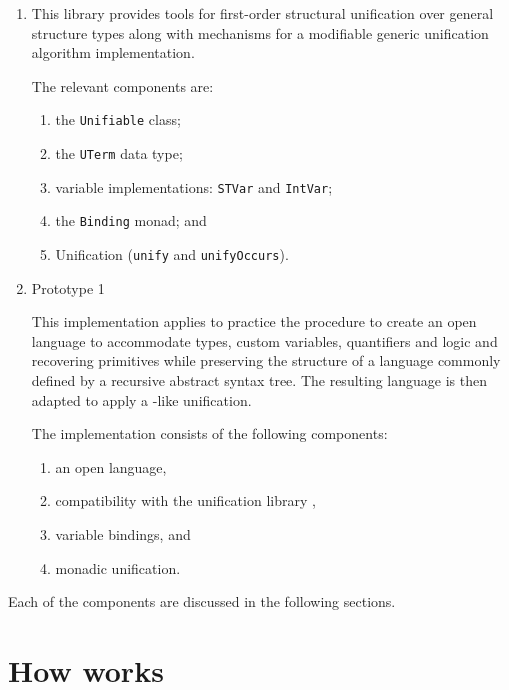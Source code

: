 \documentclass[thesis-solanki.tex]{subfiles}
\begin{document}
\begin{enumerate}
\item {} \cite{unification-fd-lib}

This library provides tools for first-order structural unification over general structure types along with mechanisms for a modifiable
generic unification algorithm implementation.

The relevant components are:
\begin{enumerate}
\item the \Verb!Unifiable! class;

\item the \Verb!UTerm! data type;

\item variable implementations:
  \Verb!STVar! and \Verb!IntVar!;

\item the \Verb!Binding! monad; and 

\item Unification (\Verb!unify! and \Verb!unifyOccurs!).
\end{enumerate}

\item Prototype 1

  This implementation applies to practice the procedure to create an open language to accommodate types,
  custom variables, quantifiers and logic and recovering primitives while preserving the structure of a
  language commonly defined by a recursive abstract syntax tree.
  The resulting language is then adapted to apply a -like unification.

The implementation consists of the following components:
\begin{enumerate}
\item an open language,

\item compatibility with the unification library \cite{unification-fd-lib},

\item variable bindings, and

\item monadic unification.

\end{enumerate}
\end{enumerate}

Each of the components are discussed in the following sections.


\section{How  works}
\end{document}
